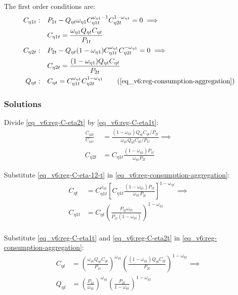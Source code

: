 \documentclass[../thesis.tex]{subfiles}
\begin{document}
	The first order conditions are:
	\begin{align}
		C_{\eta 1 t}: &\quad P_{1 t} - Q_{\eta t} \omega_{\eta 1} C_{\eta 1 t}^{\omega_{\eta 1} - 1} C_{\eta 2 t}^{1-\omega_{\eta 1}} = 0 \implies \nonumber \\
		&\quad C_{\eta 1 t} = \frac{\omega_{\eta 1} Q_{\eta t} C_{\eta t}}{P_{1t}} \label{eq_v6:reg-C-eta1t}
		\\
		C_{\eta 2 t}: &\quad P_{2 t} - Q_{\eta t} (1 - \omega_{\eta 1}) C_{\eta 1 t}^{\omega_{\eta 1}} C_{\eta 2 t}^{-\omega_{\eta 1}} = 0 \implies \nonumber \\
		&\quad C_{\eta 2 t} = \frac{(1 - \omega_{\eta 1}) Q_{\eta t} C_{\eta t}}{P_{2t}} \label{eq_v6:reg-C-eta2t}
		\\
		Q_{\eta t}: &\quad C_{\eta t} = C_{\eta 1 t}^{\omega_{\eta 1}} C_{\eta 2 t}^{1-\omega_{\eta 1}} \tag{\ref{eq_v6:reg-consumption-aggregation}}
	\end{align}

\subsubsection*{Solutions}

	Divide \ref{eq_v6:reg-C-eta2t} by \ref{eq_v6:reg-C-eta1t}:
	\begin{align}
		\frac{C_{\eta 2 t}}{C_{\eta 1 t}} &= \frac{(1 - \omega_{\eta 1}) Q_{\eta t} C_{\eta t} / P_{2t}}{\omega_{\eta 1} Q_{\eta t} C_{\eta t} / P_{1t}} \implies \nonumber \\
		C_{\eta 2 t} &= C_{\eta 1 t} \frac{(1 - \omega_{\eta 1}) P_{1t}}{\omega_{\eta 1} P_{2t}} \label{eq_v6:reg-C-eta-12-t}
	\end{align}
	
	Substitute \ref{eq_v6:reg-C-eta-12-t} in \ref{eq_v6:reg-consumption-aggregation}:
	\begin{align}
		C_{\eta t} &= C_{\eta 1 t}^{\omega_{\eta 1}} \left[ C_{\eta 1 t} \frac{(1 - \omega_{\eta 1}) P_{1t}}{\omega_{\eta 1} P_{2t}} \right]^{1-\omega_{\eta 1}} \implies \nonumber \\
		C_{\eta 1 t} &= C_{\eta t} \left( \frac{P_{2t} \omega_{\eta 1}}{P_{1t} (1 - \omega_{\eta 1})} \right)^{1-\omega_{\eta 1}} \label{eq_v6:reg-C-eta-1-t} \\
	\end{align}

	
	
	Substitute \ref{eq_v6:reg-C-eta1t} and \ref{eq_v6:reg-C-eta2t} in \ref{eq_v6:reg-consumption-aggregation}:
	\begin{align}
		C_{\eta t} &= \left( \frac{\omega_{\eta 1} Q_{\eta t} C_{\eta t}}{P_{1t}} \right)^{\omega_{\eta 1}} \left( \frac{(1 - \omega_{\eta 1}) Q_{\eta t} C_{\eta t}}{P_{2t}} \right)^{1-\omega_{\eta 1}} \implies \nonumber \\
		Q_{\eta t} &= \left( \frac{P_{1 t}}{\omega_{\eta 1}} \right)^{\omega_{\eta 1}} \left( \frac{P_{2 t}}{1 -\omega_{\eta 1}} \right)^{1 -\omega_{\eta 1}} \label{eq_v6:reg-total-expense-level}
	\end{align}
\end{document}
